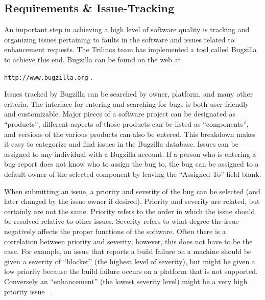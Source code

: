 \documentclass[12pt,relax]{article}
\newcommand{\InlineDirectory}[1]{
  {\hspace{0.01 in}} {\tt #1} {\hspace{0.01 in}}}
\begin{document}
\subsection{Requirements \& Issue-Tracking}

An important step in achieving a high level of software quality is tracking
and organizing issues pertaining to faults in the software and issues related 
to enhancement requests.  The Trilinos team has implemented a tool called 
Bugzilla~\cite{Bugzilla} to achieve this end.  Bugzilla  can be found 
on the web at \newline
\InlineDirectory{http://www.bugzilla.org}.

Issues tracked by Bugzilla can be searched by owner, platform, and many other 
criteria.  The 
interface for entering and searching for bugs is both user friendly and 
customizable.  Major pieces of a software project can be 
designated as ``products'', different aspects of those products can be 
listed as ``components'', and versions of the various products can also be 
entered.  This breakdown makes it easy to categorize and find issues in the 
Bugzilla database.  Issues can be assigned to any 
individual with a Bugzilla account.  If a 
person who is entering a bug report does not know who to assign the bug to,
the bug can be assigned to a default owner of the selected component 
by leaving the ``Assigned To'' field blank.  

When submitting an issue, a 
priority and severity of the bug can be selected (and later changed by the 
issue owner if desired).  Priority and severity are related, but certainly are 
not the same.  Priority refers to the order in which the issue should be 
resolved relative to other issues.  Severity refers to what degree the issue 
negatively affects the proper functions of the software.  Often there is a 
correlation between priority and severity; however, this does not have to be
the case.  For example, an issue that reports a build failure on a 
machine should be given a severity of ``blocker'' (the highest level of 
severity), but might be given a low priority because the build failure occurs
on a platform that is not supported.  Conversely an ``enhancement'' (the 
lowest severity level) might be a very high priority issue
~\cite{Bugzilla}.
\end{document}
